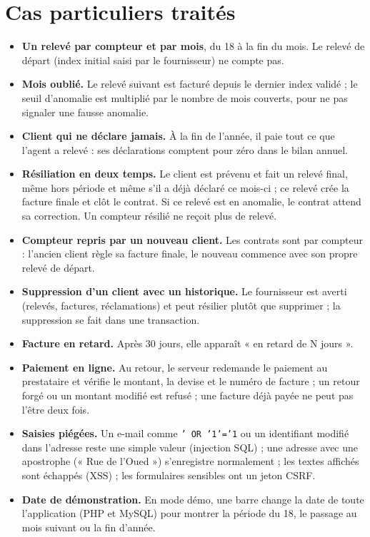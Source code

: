 \documentclass[11pt,a4paper]{article}
\begin{document}
\section{Cas particuliers traités}
\begin{itemize}
\item \textbf{Un relevé par compteur et par mois}, du 18 à la fin du mois. Le relevé de départ (index initial
  saisi par le fournisseur) ne compte pas.
\item \textbf{Mois oublié.} Le relevé suivant est facturé depuis le dernier index validé ; le seuil d'anomalie
  est multiplié par le nombre de mois couverts, pour ne pas signaler une fausse anomalie.
\item \textbf{Client qui ne déclare jamais.} À la fin de l'année, il paie tout ce que l'agent a relevé :
  ses déclarations comptent pour zéro dans le bilan annuel.
\item \textbf{Résiliation en deux temps.} Le client est prévenu et fait un relevé final, même hors période
  et même s'il a déjà déclaré ce mois-ci ; ce relevé crée la facture finale et clôt le contrat.
  Si ce relevé est en anomalie, le contrat attend sa correction. Un compteur résilié ne reçoit plus de relevé.
\item \textbf{Compteur repris par un nouveau client.} Les contrats sont par compteur : l'ancien client règle
  sa facture finale, le nouveau commence avec son propre relevé de départ.
\item \textbf{Suppression d'un client avec un historique.} Le fournisseur est averti (relevés, factures,
  réclamations) et peut résilier plutôt que supprimer ; la suppression se fait dans une transaction.
\item \textbf{Facture en retard.} Après 30 jours, elle apparaît « en retard de N jours ».
\item \textbf{Paiement en ligne.} Au retour, le serveur redemande le paiement au prestataire et vérifie le
  montant, la devise et le numéro de facture ; un retour forgé ou un montant modifié est refusé ;
  une facture déjà payée ne peut pas l'être deux fois.
\item \textbf{Saisies piégées.} Un e-mail comme \texttt{' OR '1'='1} ou un identifiant modifié dans l'adresse
  reste une simple valeur (injection SQL) ; une adresse avec une apostrophe (« Rue de l'Oued ») s'enregistre
  normalement ; les textes affichés sont échappés (XSS) ; les formulaires sensibles ont un jeton CSRF.
\item \textbf{Date de démonstration.} En mode démo, une barre change la date de toute l'application
  (PHP et MySQL) pour montrer la période du 18, le passage au mois suivant ou la fin d'année.
\end{itemize}
\end{document}
